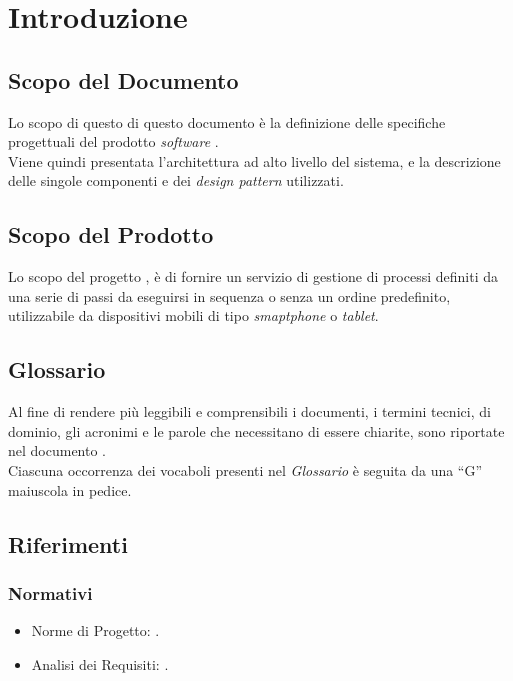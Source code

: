 \section{Introduzione}
\subsection{Scopo del Documento}
Lo scopo di questo di questo documento è la definizione delle specifiche progettuali del prodotto \textit{software} \progetto{}.\\
Viene quindi presentata l'architettura ad alto livello del sistema, e la descrizione delle singole componenti e dei \textit{design pattern} utilizzati.
\subsection{Scopo del Prodotto}
Lo scopo del progetto \progetto{}, è di fornire un servizio di gestione di processi definiti da una serie di passi da eseguirsi in sequenza o senza un ordine predefinito, utilizzabile da dispositivi mobili di tipo \textit{smaptphone} o \textit{tablet}.
\subsection{Glossario}
Al fine di rendere più leggibili e comprensibili i documenti, i termini tecnici, di dominio, gli acronimi e le parole che necessitano di essere chiarite, sono riportate nel documento \Glossario{}.\\
Ciascuna occorrenza dei vocaboli presenti nel \textit{Glossario} è seguita da una ``G'' maiuscola in pedice.
\subsection{Riferimenti}
\subsubsection{Normativi}
\begin{itemize}
\item Norme di Progetto: \NormeDiProgetto{}.
\item Analisi dei Requisiti: \AnalisiDeiRequisiti{}.
\end{itemize}
